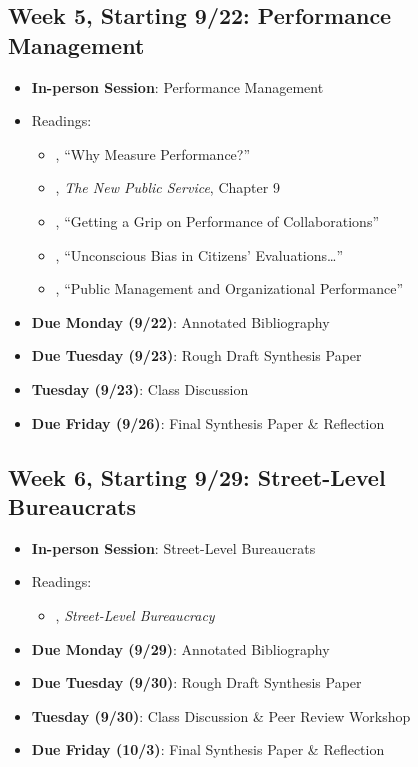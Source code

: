 \documentclass[12pt, letterpaper]{article}
\begin{document}
\subsection*{Week 5, Starting 9/22: Performance Management}
\begin{itemize}
    \item \textbf{In-person Session}: Performance Management
    \item Readings:
        \begin{itemize}
            \item \citet{Behn2003}, ``Why Measure Performance?'' 
            \item \citet{Denhardt2015}, \emph{The New Public Service}, Chapter 9 
            \item \citet{douglas2021}, ``Getting a Grip on Performance of Collaborations'' 
            \item \citet{marvel2015}, ``Unconscious Bias in Citizens' Evaluations\dots'' 
            \item \citet{nicholson-crotty2004}, ``Public Management and Organizational Performance'' 
        \end{itemize}
    \item \textbf{Due Monday (9/22)}: Annotated Bibliography
    \item \textbf{Due Tuesday (9/23)}: Rough Draft Synthesis Paper
    \item \textbf{Tuesday (9/23)}: Class Discussion
    \item \textbf{Due Friday (9/26)}: Final Synthesis Paper \& Reflection
\end{itemize}

\subsection*{Week 6, Starting 9/29: Street-Level Bureaucrats}
\begin{itemize}
    \item \textbf{In-person Session}: Street-Level Bureaucrats
    \item Readings:
        \begin{itemize}
            \item \citet{Lipsky2010}, \emph{Street-Level Bureaucracy}
        \end{itemize}
    \item \textbf{Due Monday (9/29)}: Annotated Bibliography
    \item \textbf{Due Tuesday (9/30)}: Rough Draft Synthesis Paper
    \item \textbf{Tuesday (9/30)}: Class Discussion \& Peer Review Workshop
    \item \textbf{Due Friday (10/3)}: Final Synthesis Paper \& Reflection
\end{itemize}
\end{document}

